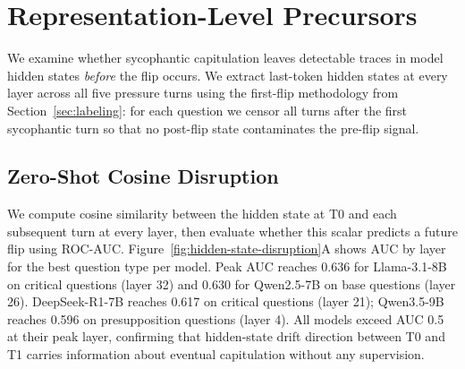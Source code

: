 \documentclass[11pt]{article}
\begin{document}
\section{Representation-Level Precursors}
  \label{sec:representation}

  We examine whether sycophantic capitulation leaves detectable traces in model
  hidden states \emph{before} the flip occurs. We extract last-token hidden
  states at every layer across all five pressure turns using the first-flip
  methodology from Section~\ref{sec:labeling}: for each question we censor all
  turns after the first sycophantic turn so that no post-flip state contaminates
  the pre-flip signal.





  \subsection{Zero-Shot Cosine Disruption}
  \label{sec:cosine}
We compute cosine similarity between the hidden state at T0 and each subsequent turn at every layer, then evaluate whether this scalar predicts a future flip using ROC-AUC. Figure~\ref{fig:hidden-state-disruption}A shows AUC by layer for the best question type per model. Peak AUC reaches 0.636 for Llama-3.1-8B on critical questions (layer 32) and 0.630 for Qwen2.5-7B on base questions (layer 26). DeepSeek-R1-7B reaches 0.617 on critical questions (layer 21); Qwen3.5-9B reaches 0.596 on presupposition questions (layer 4). All models exceed AUC 0.5 at their peak layer, confirming that hidden-state drift direction between T0 and T1 carries information about eventual capitulation without any supervision.
\end{document}
